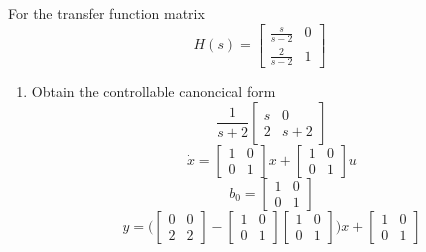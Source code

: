 \item For the transfer function matrix
  \begin{equation}
    H(s) =
    \begin{bmatrix}
      \frac s {s-2} & 0 \\
      \frac 2 {s-2} & 1 
    \end{bmatrix}
  \end{equation}
  \begin{enumerate}
  \item Obtain the controllable canoncical form \\
    \begin{equation}
      \frac 1 {s+2}
      \begin{bmatrix}
        s & 0 \\
        2 & s+2
      \end{bmatrix}
    \end{equation}
    \begin{equation}
      \dot x =
      \begin{bmatrix}
        1 & 0 \\
        0 & 1
      \end{bmatrix}x +
      \begin{bmatrix}
        1 & 0 \\
        0 & 1 
      \end{bmatrix}u
    \end{equation}
    \begin{equation}
      b_0 =
      \begin{bmatrix}
        1 & 0 \\
        0 & 1
      \end{bmatrix}
    \end{equation}
    \begin{equation}
      y =
      \big (
      \begin{bmatrix}
        0 & 0 \\
        2 & 2
      \end{bmatrix} - 
      \begin{bmatrix}
        1 & 0 \\
        0 & 1
      \end{bmatrix}
      \begin{bmatrix}
        1 & 0 \\
        0 & 1
      \end{bmatrix}
      \big )x +
      \begin{bmatrix}
        1 & 0 \\
        0 & 1

\end{bmatrix}
\end{equation}
\end{enumerate}
